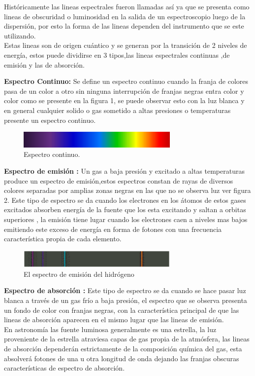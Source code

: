 \documentclass[11pt]{article}
\begin{document}
Históricamente las lineas espectrales fueron llamadas así ya que se  presenta como lineas de obscuridad o luminosidad en la salida de un espectroscopio luego de la dispersión, por esto la forma de las lineas dependen del instrumento que se este utilizando.\\
Estas lineas son de origen cuántico y se generan por la transición de 2 niveles de energía, estos puede dividirse en 3 tipos,las lineas espectrales continuas ,de emisión y las de absorción.\cite{troccoli}


\textbf{Espectro Continuo:}
Se define un espectro continuo cuando la franja de colores  pasa de un color a otro sin ninguna interrupción de franjas negras entra color y color como se presente en la figura 1, se puede observar esto con la luz blanca y en general cualquier solido o gas sometido a altas presiones o temperaturas presente un espectro continuo.


\begin{figure}[htb!]
\centering
\includegraphics[width=0.7\textwidth]{1}
\caption[Descripción versión comprimida]{Espectro continuo.\cite{libro}}
 \label{fig:fig6}
\end{figure}

\textbf{Espectro de emisión :} Un gas a baja presión y excitado a altas temperaturas produce un espectro de emisión,estos espectros constan de rayas de diversos colores separadas por amplias zonas  negras en las que no se observa luz ver figura 2. Este tipo de espectro se da cuando los electrones en los átomos de estos gases excitados absorben energía de la fuente que los esta excitando  y saltan a orbitas superiores , la emisión tiene lugar cuando los electrones caen a niveles mas bajos emitiendo este exceso de energía en forma de fotones con una frecuencia característica propia de cada elemento.


 \begin{figure}[htb!]
\centering
\includegraphics[width=0.7\textwidth]{2}
\caption[Descripción versión comprimida]{El espectro de emisión del hidrógeno \cite{articulo1}}
 \label{fig:fig6}
\end{figure}


\textbf{Espectro de absorción :} Este tipo de espectro se da cuando se hace pasar luz blanca a través de un gas frío a baja presión, el espectro que se observa presenta un fondo de color con franjas negras, con la característica principal de que las lineas de absorción aparecen en el mismo lugar que las lineas de emisión.\\
En astronomía las fuente luminosa generalmente es una estrella, la luz proveniente de la estrella atraviesa capas de gas propia de la atmósfera, las lineas de absorción dependerán estrictamente de la composición química del gas, esta absolverá fotones de una u otra longitud de onda dejando las franjas obscuras características de espectro de absorción.
\end{document}
